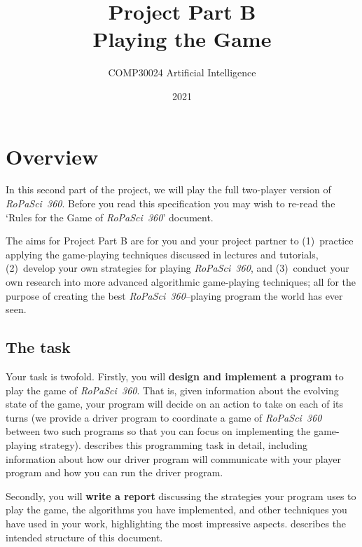 \documentclass[]{article}
\title{
    {\LARGE Project Part B}
    \\[1ex]
    {\Huge\bf Playing the Game}
}
\author{
    COMP30024 Artificial Intelligence
}
\date{2021}
\newcommand{\uptoken}[3] {
    \node[draw,circle,minimum size=5.3mm,fill=white] at (#1, #2) {};
    \node[draw,circle,minimum size=4.2mm,very thick,black]  at (#1, #2) {};
    \node[] at (#1, #2) {#3};
}
\newcommand{\lotoken}[3] {
    \node[draw,circle,minimum size=5.3mm,fill=white] at (#1, #2) {};
    \node[draw,circle,minimum size=4.2mm,very thick,purple] at (#1, #2) {};
    \node[] at (#1, #2) {#3};
}
\newcommand{\board} {
    \tikzset{
        hex/.style={
            regular polygon,
            regular polygon sides=6,
            minimum size=7mm,
            inner sep=0mm,
            outer sep=0mm,
            rotate=30,
            draw
        },
        x={(3.031mm,5.25mm)},
        y={(6.062mm,0mm)}
    }
    \foreach \r/\q in {
                    +4/-4,+4/-3,+4/-2,+4/-1,+4/+0,
                 +3/-4,+3/-3,+3/-2,+3/-1,+3/+0,+3/+1,
              +2/-4,+2/-3,+2/-2,+2/-1,+2/+0,+2/+1,+2/+2,
           +1/-4,+1/-3,+1/-2,+1/-1,+1/+0,+1/+1,+1/+2,+1/+3,
        +0/-4,+0/-3,+0/-2,+0/-1,+0/+0,+0/+1,+0/+2,+0/+3,+0/+4,
           -1/-3,-1/-2,-1/-1,-1/+0,-1/+1,-1/+2,-1/+3,-1/+4,
              -2/-2,-2/-1,-2/+0,-2/+1,-2/+2,-2/+3,-2/+4,
                 -3/-1,-3/+0,-3/+1,-3/+2,-3/+3,-3/+4,
                    -4/+0,-4/+1,-4/+2,-4/+3,-4/+4,
    }
        \node[hex,fill=black!5] at (\r, \q) {};
}
\begin{document}
\maketitle


\section{Overview}
\label{sec:overview}

In this second part of the project, we will play the full two-player
version of \emph{RoPaSci~360}.
Before you read this specification you may wish to re-read the
`Rules for the Game of \emph{RoPaSci~360}' document.

The aims for Project Part B are for you and your project partner to
(1)~practice applying the game-playing techniques discussed in
    lectures and tutorials,
(2)~develop your own strategies for playing \emph{RoPaSci~360}, and
(3)~conduct your own research into more advanced algorithmic game-playing
    techniques;
all for the purpose of creating the best \emph{RoPaSci~360}--playing
program the world has ever seen.

\begin{figure}[ht!]
    \centering
\end{figure}

\subsection{The task}

Your task is twofold.
%
Firstly, you will \textbf{design and implement a program} to play the
game of \emph{RoPaSci~360}.
That is, given information about the evolving state of the game, your
program will decide on an action to take on each of its turns
(we provide a driver program to coordinate a game of \emph{RoPaSci~360}
between two such programs so that you can focus on implementing the
game-playing strategy).
%
 describes this programming task in detail, including
information about how our driver program will communicate with your
player program and how you can run the driver program.

Secondly, you will \textbf{write a report} discussing the strategies your
program uses to play the game, the algorithms you have implemented, and
other techniques you have used in your work, highlighting the most
impressive aspects.
%
 describes the intended structure of this document.
\end{document}
